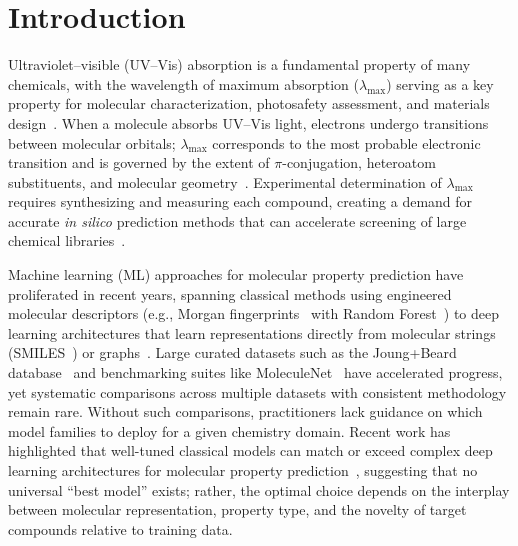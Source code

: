 \documentclass[journal=jcisd8,manuscript=article]{achemso}
\begin{document}
\section{Introduction}
\label{sec:introduction}

Ultraviolet--visible (UV--Vis) absorption is a fundamental property of many chemicals, with the wavelength of maximum absorption ($\lambda_{\max}$) serving as a key property for molecular characterization, photosafety assessment, and materials design~\cite{flemingMolecular2010}.
When a molecule absorbs UV--Vis light, electrons undergo transitions between molecular orbitals; $\lambda_{\max}$ corresponds to the most probable electronic transition and is governed by the extent of $\pi$-conjugation, heteroatom substituents, and molecular geometry~\cite{reichardt2011solvents}.
Experimental determination of $\lambda_{\max}$ requires synthesizing and measuring each compound, creating a demand for accurate \textit{in silico} prediction methods that can accelerate screening of large chemical libraries~\cite{ghosh2019deep}.

Machine learning (ML) approaches for molecular property prediction have proliferated in recent years, spanning classical methods using engineered molecular descriptors (e.g., Morgan fingerprints~\cite{rogers2010extended} with Random Forest~\cite{breiman2001random}) to deep learning architectures that learn representations directly from molecular strings (SMILES~\cite{weininger1988smiles}) or graphs~\cite{gilmer2017neural}.
Large curated datasets such as the Joung+Beard database~\cite{joung2020experimental, beard2019comparative} and benchmarking suites like MoleculeNet~\cite{wuMoleculeNet2018} have accelerated progress, yet systematic comparisons across multiple datasets with consistent methodology remain rare. Without such comparisons, practitioners lack guidance on which model families to deploy for a given chemistry domain.
Recent work has highlighted that well-tuned classical models can match or exceed complex deep learning architectures for molecular property prediction~\cite{panapitiya2022evaluation, walters2021applications, fooladi2025evaluating}, suggesting that no universal ``best model'' exists; rather, the optimal choice depends on the interplay between molecular representation, property type, and the novelty of target compounds relative to training data.
\end{document}
